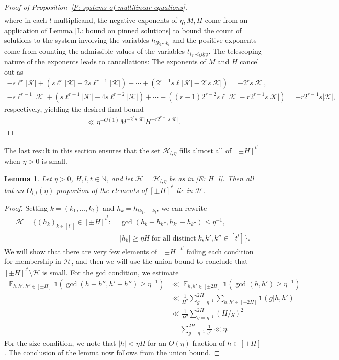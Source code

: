\documentclass[11pt]{amsart}
\newtheorem{lemma}{Lemma}[section]
\theoremstyle{definition}
\DeclareMathOperator*{\E}{\mathbb{E}}
\newcommand{\N}{{\mathbb N}}
\newcommand{\CH}{{\mathcal H}}
\newcommand{\CK}{{\mathcal K}}
\newcommand{\uk}{{\underline{k}}}
\newcommand{\uu}{{\underline{u}}}
\newcommand{\inv}{^{-1}}
\newcommand{\brac}[1]{\mathopen{}\left( #1 \mathclose{}\right)}
\begin{document}
\begin{proof}[Proof of Proposition~\ref{P: systems of multilinear equations}]
\begin{align*}
    \end{align*}
    where in each $l$-multiplicand, the negative exponents of $\eta, M, H$ come from an application of Lemma \ref{L: bound on pinned solutions} to bound the count of solutions to the system involving the variables $h_{lk_1\cdots k_l}$ and the positive exponents come from counting the admissible values of the variables $t_{i_1\cdots i_l j\uk\uu}$. The telescoping nature of the exponents leads to cancellations: The exponents of $M$ and $H$ cancel out as
    \begin{gather*}
        -s\ell^r|\CK| + (s\ell^r|\CK| - 2s\ell^{r-1}|\CK|) + \cdots + (2^{r-1}s\ell|\CK| - 2^r s|\CK|) = -2^r s|\CK|,\\
        -s\ell^{r-1}|\CK| + (s\ell^{r-1}|\CK| - 4s\ell^{r-2}|\CK|) + \cdots + ((r-1)2^{r-2}s\ell|\CK| - r2^{r-1}s|\CK|) = -r2^{r-1}s|\CK|,
    \end{gather*}
    respectively, yielding the desired final bound
    \begin{align*}
        \ll\eta^{-O(1)} M^{-2^r s|\CK|} H^{-r2^{r-1}s|\CK|}.
    \end{align*} 
    \end{proof}

The last result in this section ensures that the set $\CH_{l, \eta}$ fills almost all of $[\pm H]^{t^l}$ when $\eta>0$ is small.
\begin{lemma}\label{L: H_l}
    Let $\eta>0$, $H, l, t\in\N$, and let $\CH = \CH_{l,\eta}$ be as in \eqref{E: H_l}. Then all but an $O_{l,t}(\eta)$-proportion of the elements of $[\pm H]^{t^l}$ lie in $\CH$.
\end{lemma}
\begin{proof}
    Setting $k = (k_1, \ldots, k_l)$ and $h_k = h_{lk_1, \ldots, k_l}$, we can rewrite
    \begin{align*}
        \CH = \{(h_k)_{k\in[t^l]}\in[\pm H]^{t^l}:\; &\gcd(h_k - h_{k''}, h_{k'}-h_{k''})\leq \eta\inv,\\ &|h_k|\geq\eta H\; \textrm{for all distinct}\; k,k',k''\in[t^l]\}.
    \end{align*}
    We will show that there are very few elements of $[\pm H]^{t^l}$ failing each condition for membership in $\CH$, and then we will use the union bound to conclude that $[\pm H]^{t^l} \setminus \CH$ is small.  For the gcd condition, we estimate
    \begin{align*}
        \E_{h, h',h''\in[\pm H]}\mathbf{1}\brac{\gcd(h-h'', h'-h'')\geq \eta\inv}&\ll \E_{h, h'\in[\pm 2H]}\mathbf{1}\brac{\gcd(h, h')\geq \eta\inv}\\
        &\ll \frac{1}{H^2}\sum_{g=\eta\inv}^{2H}\sum_{h,h'\in[\pm 2H]}\mathbf{1}\brac{g|h,h'}\\
        &\ll \frac{1}{H^2}\sum_{g=\eta\inv}^{2H}(H/g)^2\\
        &= \sum_{g=\eta\inv}^{2H}\frac{1}{g^2}\ll\eta.
    \end{align*}
For the size condition, we note that $|h|<\eta H$ for an $O(\eta)$-fraction of $h \in [\pm H]$.  The conclusion of the lemma now follows from the union bound.
\end{proof}
\end{document}
